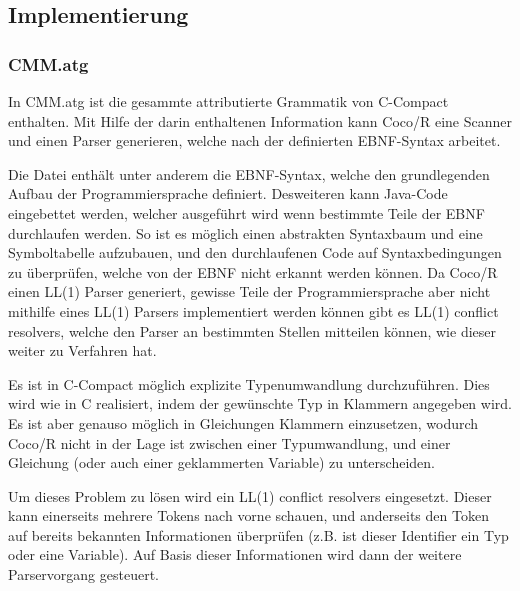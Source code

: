 

\newpage
\subsection{Implementierung}

\subsubsection{CMM.atg}

In CMM.atg ist die gesammte attributierte Grammatik von C-Compact enthalten. Mit Hilfe der darin enthaltenen Information kann Coco/R eine Scanner und einen Parser generieren, welche nach der definierten EBNF-Syntax arbeitet.

Die Datei enth\"alt unter anderem die EBNF-Syntax, welche den grundlegenden Aufbau der Programmiersprache definiert. Desweiteren kann Java-Code eingebettet werden, welcher ausgef\"uhrt wird wenn bestimmte Teile der EBNF durchlaufen werden. So ist es m\"oglich einen abstrakten Syntaxbaum und eine Symboltabelle aufzubauen, und den durchlaufenen Code auf Syntaxbedingungen zu \"uberpr\"ufen, welche von der EBNF nicht erkannt werden k\"onnen. Da Coco/R einen LL(1) Parser generiert, gewisse Teile der Programmiersprache aber nicht mithilfe eines LL(1) Parsers implementiert werden k\"onnen gibt es LL(1) conflict resolvers, welche den Parser an bestimmten Stellen mitteilen k\"onnen, wie dieser weiter zu Verfahren hat.


Es ist in C-Compact m\"oglich explizite Typenumwandlung durchzuf\"uhren. Dies wird wie in C realisiert, indem der gew\"unschte Typ in Klammern angegeben wird. Es ist aber genauso m\"oglich in Gleichungen Klammern einzusetzen, wodurch Coco/R nicht in der Lage ist zwischen einer Typumwandlung, und einer Gleichung (oder auch einer geklammerten Variable) zu unterscheiden.

Um dieses Problem zu l\"osen wird ein LL(1) conflict resolvers eingesetzt. Dieser kann einerseits mehrere Tokens nach vorne schauen, und anderseits den Token auf bereits bekannten Informationen \"uberpr\"ufen (z.B. ist dieser Identifier ein Typ oder eine Variable). Auf Basis dieser Informationen wird dann der weitere Parservorgang gesteuert.


